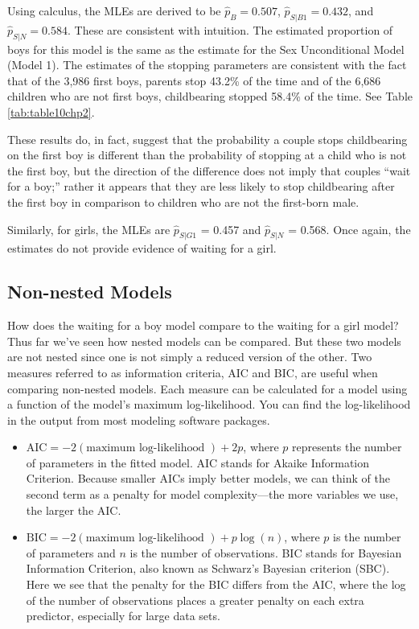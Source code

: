\documentclass[
]{krantz}
\providecommand{\tightlist}{%
  \setlength{\itemsep}{0pt}\setlength{\parskip}{0pt}}
\begin{document}
Using calculus, the MLEs are derived to be \(\hat{p}_B = 0.507\), \(\hat{p}_{S|B1} = 0.432\), and \(\hat{p}_{S|N} = 0.584\). These are consistent with intuition. The estimated proportion of boys for this model is the same as the estimate for the Sex Unconditional Model (Model 1). The estimates of the stopping parameters are consistent with the fact that of the 3,986 first boys, parents stop 43.2\% of the time and of the 6,686 children who are not first boys, childbearing stopped 58.4\% of the time. See Table \ref{tab:table10chp2}.

These results do, in fact, suggest that the probability a couple stops childbearing on the first boy is different than the probability of stopping at a child who is not the first boy, but the direction of the difference does not imply that couples ``wait for a boy;'' rather it appears that they are less likely to stop childbearing after the first boy in comparison to children who are not the first-born male.

Similarly, for girls, the MLEs are \(\hat{p}_{S|G1}\) = 0.457 and \(\hat{p}_{S|N}\) = 0.568. Once again, the estimates do not provide evidence of waiting for a girl.

\subsection{Non-nested Models}\label{non-nested-models}

How does the waiting for a boy model compare to the waiting for a girl model? Thus far we've seen how nested models can be compared. But these two models are not nested since one is not simply a reduced version of the other. Two measures referred to as information criteria, AIC and BIC, are useful when comparing non-nested models. Each measure can be calculated for a model using a function of the model's maximum log-likelihood. You can find the log-likelihood in the output from most modeling software packages.

\begin{itemize}
\tightlist
\item
  \(\textrm{AIC} = -2 (\textrm{maximum log-likelihood }) + 2p\), where \(p\) represents the number of parameters in the fitted model. AIC stands for Akaike Information Criterion.  Because smaller AICs imply better models, we can think of the second term as a penalty for model complexity---the more variables we use, the larger the AIC.
\item
  \(\textrm{BIC} = -2 (\textrm{maximum log-likelihood }) + p\log(n)\), where \(p\) is the number of parameters and \(n\) is the number of observations. BIC stands for Bayesian Information Criterion,  also known as Schwarz's Bayesian criterion (SBC). Here we see that the penalty for the BIC differs from the AIC, where the log of the number of observations places a greater penalty on each extra predictor, especially for large data sets.
\end{itemize}
\end{document}
